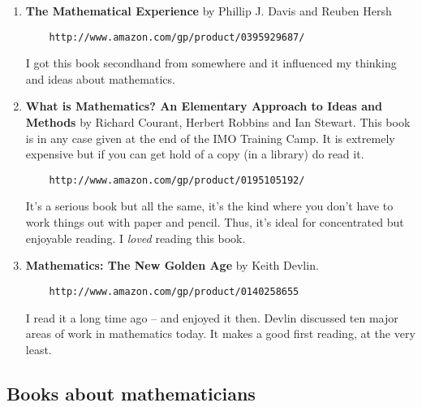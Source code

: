 \documentclass[a4paper]{amsart}
\begin{document}
\begin{enumerate}
\item {\bf The Mathematical Experience} by Phillip J. Davis and Reuben Hersh
  \begin{verbatim}
    http://www.amazon.com/gp/product/0395929687/
  \end{verbatim}

  I got this book secondhand from somewhere and it influenced my thinking and ideas about mathematics.
\item {\bf What is Mathematics? An Elementary Approach to Ideas and Methods} by Richard Courant, Herbert Robbins and Ian Stewart.
  This book is in any case given at the end of the IMO Training Camp. It is extremely expensive but if you can get hold of a copy
  (in a library) do read it.
  \begin{verbatim}
    http://www.amazon.com/gp/product/0195105192/
  \end{verbatim}

  It's a serious book but all the same, it's the kind where you don't have to work things out with paper and pencil.
  Thus, it's ideal for concentrated but enjoyable reading. I {\em loved} reading this book.

\item {\bf Mathematics: The New Golden Age} by Keith Devlin.
  \begin{verbatim}
    http://www.amazon.com/gp/product/0140258655
  \end{verbatim}

  I read it a long time ago -- and enjoyed it then. Devlin discussed ten major areas of work in mathematics today.
  It makes a good first reading, at the very least.
\end{enumerate}

\subsection{Books about mathematicians}
\end{document}
